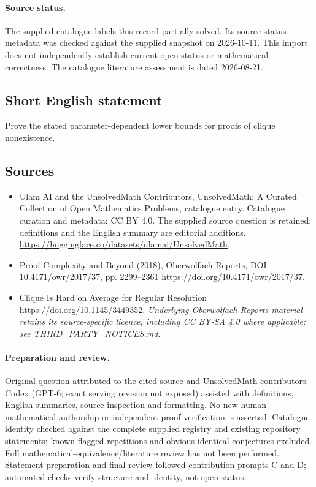 \documentclass[11pt]{article}
\begin{document}
\paragraph{Source status.}
The supplied catalogue labels this record partially solved. Its source-status metadata was checked against the supplied snapshot on 2026-10-11. This import does not independently establish current open status or mathematical correctness. The catalogue literature assessment is dated 2026-08-21.
\subsection{Short English statement}
Prove the stated parameter-dependent lower bounds for proofs of clique nonexistence.
\subsection{Sources}
\begin{itemize}
\item[S1] Ulam AI and the UnsolvedMath Contributors, UnsolvedMath: A Curated Collection of Open Mathematics Problems, catalogue entry. Catalogue curation and metadata: CC BY 4.0. The supplied source question is retained; definitions and the English summary are editorial additions.
\url{https://huggingface.co/datasets/ulamai/UnsolvedMath}.
\item[S2] Proof Complexity and Beyond (2018), Oberwolfach Reports, DOI 10.4171/owr/2017/37, pp. 2299--2361
\url{https://doi.org/10.4171/owr/2017/37}.
\item[S3] Clique Is Hard on Average for Regular Resolution
\url{https://doi.org/10.1145/3449352}.
\textit{Underlying Oberwolfach Reports material retains its source-specific licence, including CC BY-SA 4.0 where applicable; see THIRD\_PARTY\_NOTICES.md.}
\end{itemize}
\paragraph{Preparation and review.}
Original question attributed to the cited source and UnsolvedMath contributors. Codex (GPT-6; exact serving revision not exposed) assisted with definitions, English summaries, source inspection and formatting. No new human mathematical authorship or independent proof verification is asserted. Catalogue identity checked against the complete supplied registry and existing repository statements; known flagged repetitions and obvious identical conjectures excluded. Full mathematical-equivalence/literature review has not been performed. Statement preparation and final review followed contribution prompts C and D; automated checks verify structure and identity, not open status.
\label{end:statement}
\end{document}
